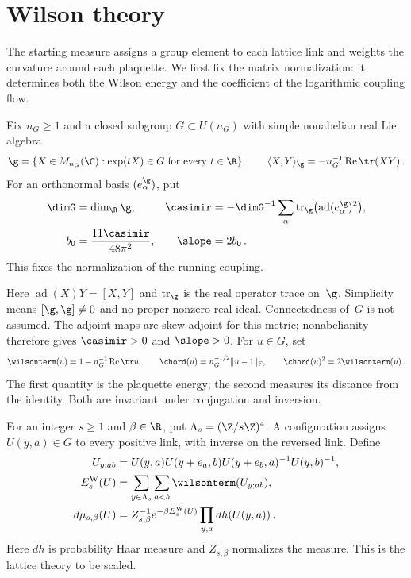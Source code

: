 \section{Wilson theory}\label{sec:wilson}

The starting measure assigns a group element to each lattice link and weights the curvature around each plaquette. We first fix the matrix normalization: it determines both the Wilson energy and the coefficient of the logarithmic coupling flow.

\begin{definition}\label{def:D01}
Fix $n_G\ge1$ and a closed subgroup $G\subset U(n_G)$ with simple nonabelian real Lie algebra
\begin{equation*}
\g=\{X\in M_{n_G}(\C):\exp(tX)\in G\text{ for every }t\in\R\},
\qquad \langle X,Y\rangle_\g=-n_G^{-1}\operatorname{Re}\tr(XY)\,.
\end{equation*}
For an orthonormal basis $(e_\alpha^{\g})$, put
\begin{align*}
\dimG&=\dim_\R\g,&
\casimir&=-\dimG^{-1}\sum_\alpha\operatorname{tr}_{\g}\bigl(\operatorname{ad}(e_\alpha^{\g})^2\bigr),\\
b_0&=\frac{11\casimir}{48\pi^2},& \slope&=2b_0\,.
\end{align*}
This fixes the normalization of the running coupling.
\end{definition}

Here $\operatorname{ad}(X)Y=[X,Y]$ and $\operatorname{tr}_{\g}$ is the real operator trace on~$\g$. Simplicity means $[\g,\g]\ne0$ and no proper nonzero real ideal. Connectedness of~$G$ is not assumed. The adjoint maps are skew-adjoint for this metric; nonabelianity therefore gives $\casimir>0$ and $\slope>0$. For $u\in G$, set
\begin{equation}\label{eq:I12-price-chord}
\wilsonterm(u)=1-n_G^{-1}\operatorname{Re}\tr u,\qquad
\chord(u)=n_G^{-1/2}\|u-1\|_{\rm F},\qquad
\chord(u)^2=2\wilsonterm(u)\,.
\end{equation}
The first quantity is the plaquette energy; the second measures its distance from the identity. Both are invariant under conjugation and inversion.

\begin{definition}\label{def:D02}
For an integer $s\ge1$ and $\beta\in\R$, put $\Lambda_s=(\Z/s\Z)^4$. A configuration assigns $U(y,a)\in G$ to every positive link, with inverse on the reversed link. Define
\begin{align*}
U_{y;ab}&=U(y,a)U(y+e_a,b)U(y+e_b,a)^{-1}U(y,b)^{-1},\\
E_s^{\rm W}(U)&=\sum_{y\in\Lambda_s}\sum_{a<b}\wilsonterm(U_{y;ab}),\\
d\mu_{s,\beta}(U)&=Z_{s,\beta}^{-1}e^{-\beta E_s^{\rm W}(U)}\prod_{y,a}dh(U(y,a))\,.
\end{align*}
Here $dh$ is probability Haar measure and $Z_{s,\beta}$ normalizes the measure. This is the lattice theory to be scaled.
\end{definition}

